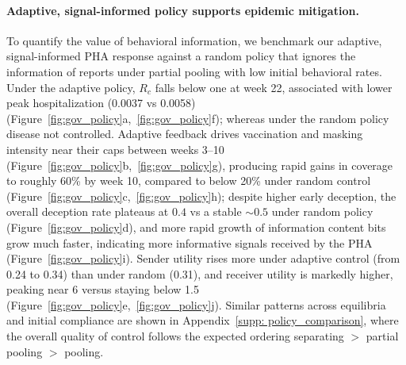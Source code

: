 \documentclass[sigconf,review]{acmart}
\begin{document}
\paragraph{Adaptive, signal-informed policy supports epidemic mitigation.}
To quantify the value of behavioral information, we benchmark our adaptive, signal-informed PHA response against a random policy that ignores the information of reports under partial pooling with low initial behavioral rates. 
Under the adaptive policy, $R_c$ falls below one at week 22, associated with lower peak hospitalization (0.0037 vs 0.0058) (Figure~\ref{fig:gov_policy}a,~\ref{fig:gov_policy}f); whereas under the random policy disease not controlled.
Adaptive feedback drives vaccination and masking intensity near their caps between weeks 3–10 (Figure~\ref{fig:gov_policy}b,~\ref{fig:gov_policy}g), producing rapid gains in coverage to roughly 60\% by week 10, compared to below 20\% under random control (Figure~\ref{fig:gov_policy}c,~\ref{fig:gov_policy}h); despite higher early deception, the overall deception rate plateaus at $0.4$ vs a stable $\sim0.5$ under random policy (Figure~\ref{fig:gov_policy}d), and more rapid growth of information content bits grow much faster, indicating more informative signals received by the PHA (Figure~\ref{fig:gov_policy}i). Sender utility rises more under adaptive control (from 0.24 to 0.34) than under random (0.31), and receiver utility is markedly higher, peaking near 6 versus staying below 1.5 (Figure~\ref{fig:gov_policy}e,~\ref{fig:gov_policy}j). Similar patterns across equilibria and initial compliance are shown in Appendix~\ref{supp: policy_comparison}, where the overall quality of control follows the expected ordering separating $>$ partial pooling $>$ pooling.
\end{document}
